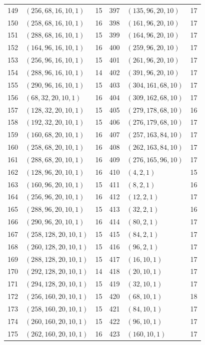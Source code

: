 \begin{longtable}{@{}rlr@{\hspace{12mm}}rlr@{}}
149 & $(256,68,16,10,1)$ & 15 & 397 & $(135,96,20,10)$ & 17\\
150 & $(258,68,16,10,1)$ & 16 & 398 & $(161,96,20,10)$ & 17\\
151 & $(288,68,16,10,1)$ & 15 & 399 & $(164,96,20,10)$ & 17\\
152 & $(164,96,16,10,1)$ & 16 & 400 & $(259,96,20,10)$ & 17\\
153 & $(256,96,16,10,1)$ & 15 & 401 & $(261,96,20,10)$ & 17\\
154 & $(288,96,16,10,1)$ & 14 & 402 & $(391,96,20,10)$ & 17\\
155 & $(290,96,16,10,1)$ & 15 & 403 & $(304,161,68,10)$ & 17\\
156 & $(68,32,20,10,1)$ & 16 & 404 & $(309,162,68,10)$ & 17\\
157 & $(128,32,20,10,1)$ & 15 & 405 & $(279,178,68,10)$ & 16\\
158 & $(192,32,20,10,1)$ & 15 & 406 & $(276,179,68,10)$ & 17\\
159 & $(160,68,20,10,1)$ & 16 & 407 & $(257,163,84,10)$ & 17\\
160 & $(258,68,20,10,1)$ & 16 & 408 & $(262,163,84,10)$ & 17\\
161 & $(288,68,20,10,1)$ & 16 & 409 & $(276,165,96,10)$ & 17\\
162 & $(128,96,20,10,1)$ & 16 & 410 & $(4,2,1)$ & 15\\
163 & $(160,96,20,10,1)$ & 15 & 411 & $(8,2,1)$ & 16\\
164 & $(256,96,20,10,1)$ & 16 & 412 & $(12,2,1)$ & 17\\
165 & $(288,96,20,10,1)$ & 15 & 413 & $(32,2,1)$ & 16\\
166 & $(290,96,20,10,1)$ & 16 & 414 & $(80,2,1)$ & 17\\
167 & $(258,128,20,10,1)$ & 15 & 415 & $(84,2,1)$ & 17\\
168 & $(260,128,20,10,1)$ & 15 & 416 & $(96,2,1)$ & 17\\
169 & $(288,128,20,10,1)$ & 15 & 417 & $(16,10,1)$ & 17\\
170 & $(292,128,20,10,1)$ & 14 & 418 & $(20,10,1)$ & 17\\
171 & $(294,128,20,10,1)$ & 15 & 419 & $(32,10,1)$ & 17\\
172 & $(256,160,20,10,1)$ & 15 & 420 & $(68,10,1)$ & 18\\
173 & $(258,160,20,10,1)$ & 15 & 421 & $(84,10,1)$ & 17\\
174 & $(260,160,20,10,1)$ & 15 & 422 & $(96,10,1)$ & 17\\
175 & $(262,160,20,10,1)$ & 16 & 423 & $(160,10,1)$ & 17\\

\end{longtable}
